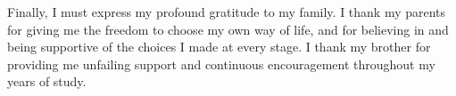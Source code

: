 Finally, I must express my profound gratitude to my family. I thank my parents for giving me the 
freedom to choose my own way of life, and for believing in and being supportive of the choices I 
made at every stage.  I thank my brother for providing me unfailing support and continuous 
encouragement throughout my years of study. %



